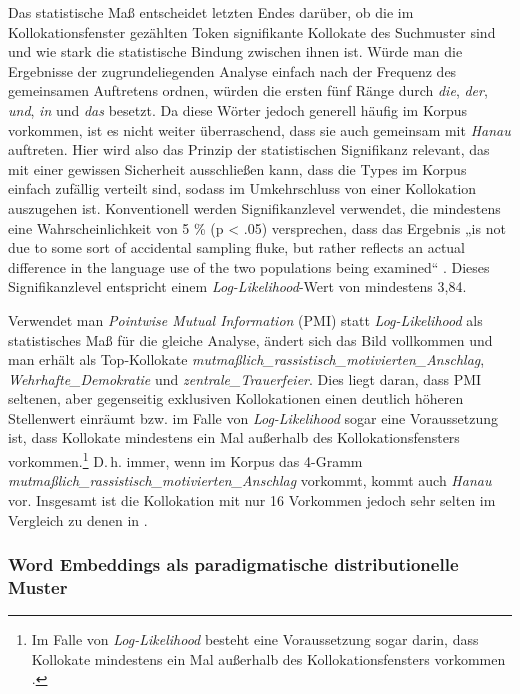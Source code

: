 Das statistische Maß entscheidet letzten Endes darüber, ob die im Kollokationsfenster gezählten Token signifikante Kollokate des Suchmuster sind und wie stark die statistische Bindung zwischen ihnen ist. Würde man die Ergebnisse der  zugrundeliegenden Analyse einfach nach der Frequenz des gemeinsamen Auftretens ordnen, würden die ersten fünf Ränge durch \emph{die}, \emph{der}, \emph{und}, \emph{in} und \emph{das} besetzt. Da diese Wörter jedoch generell häufig im Korpus vorkommen, ist es nicht weiter überraschend, dass sie auch gemeinsam mit \emph{Hanau} auftreten. Hier wird also das Prinzip der statistischen Signifikanz relevant, das mit einer gewissen Sicherheit ausschließen kann, dass die Types im Korpus einfach zufällig verteilt sind, sodass im Umkehrschluss von einer Kollokation auszugehen ist. Konventionell werden Signifikanzlevel verwendet, die mindestens eine Wahrscheinlichkeit von 5 \% (p \textless{} .05) versprechen, dass das Ergebnis „is not due to some sort of accidental sampling fluke, but rather reflects an actual difference in the language use of the two populations being examined`` \autocite[63]{bakerSociolinguisticsCorpusLinguistics2010}. Dieses Signifikanzlevel entspricht einem \emph{Log-Likelihood}-Wert von mindestens 3,84.

Verwendet man \emph{Pointwise Mutual Information} (PMI) statt \emph{Log-Likelihood} als statistisches Maß für die gleiche Analyse, ändert sich das Bild vollkommen und man erhält als Top-Kollokate \emph{mutmaßlich\_rassistisch\_motivierten\_Anschlag}, \emph{Wehrhafte\_Demokratie} und \emph{zentrale\_Trauerfeier}. Dies liegt daran, dass PMI seltenen, aber gegenseitig exklusiven Kollokationen einen deutlich höheren Stellenwert einräumt bzw. im Falle von \emph{Log-Likelihood} sogar eine Voraussetzung ist, dass Kollokate mindestens ein Mal außerhalb des Kollokationsfensters vorkommen.\footnote{Im Falle von \emph{Log-Likelihood} besteht eine Voraussetzung sogar darin, dass Kollokate mindestens ein Mal außerhalb des Kollokationsfensters vorkommen \autocite{blaetteComputeLoglikelihoodStatistics2020}.} D.\,h. immer, wenn im Korpus das 4-Gramm \emph{mutmaßlich\_rassistisch\_motivierten\_Anschlag} vorkommt, kommt auch \emph{Hanau} vor. Insgesamt ist die Kollokation mit nur 16 Vorkommen jedoch sehr selten im Vergleich zu denen in  \autocites[siehe zu einem ausführlichen Überblick zu Kollokationsmaßen][]{evertStatisticsWordCooccurrences2005, evert58CorporaCollocations2009}.

\subsubsection{Word Embeddings als paradigmatische distributionelle Muster}\label{word-embeddings-als-paradigmatische-distributionelle-muster}

